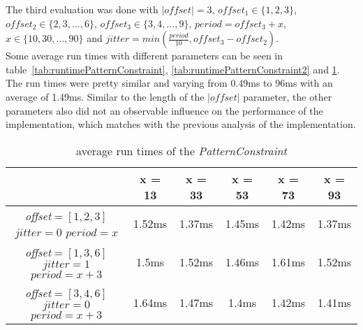 The third evaluation was done with $|offset| = 3$, $offset_1\in\{1, 2, 3\}$, $offset_2\in\{2, 3, ..., 6\}$, $offset_3\in\{3, 4, ..., 9\}$, $period=offset_3+x$, $x\in\{10, 30, ..., 90\}$ and $jitter = min(\frac{period}{10}, offset_3-offset_2)$.\\
Some average run times with different parameters can be seen in table~\ref{tab:runtimePatternConstraint}, \ref{tab:runtimePatternConstraint2} and \ref{tab:runtimePatternConstraint3}. The run times were pretty similar and varying from 0.49ms to 96ms with an average of 1.49ms. Similar to the length of the $|offset|$ parameter, the other parameters also did not an observable influence on the performance of the implementation, which matches with the previous analysis of the implementation.
\begin{table}
	\begin{tabular}{|c|c|c|c|c|c|}
		\hline
		& x = 13 & x = 33 & x = 53 & x = 73 & x = 93\\
		\hline
		\makecell{\textit{offset}$=[1,2,3]$\\$jitter=0$\\$period=x$}& 1.52ms & 1.37ms & 1.45ms & 1.42ms & 1.37ms\\
		\hline
		\makecell{\textit{offset}$=[1,3,6]$\\$jitter=1$\\$period=x+3$}& 1.5ms & 1.52ms & 1.46ms & 1.61ms & 1.52ms\\
		\hline
		\makecell{\textit{offset}$=[3,4,6]$\\$jitter=0$\\$period=x+3$}& 1.64ms & 1.47ms & 1.4ms & 1.42ms & 1.41ms\\
		\hline
	\end{tabular}
	\centering
	\caption{average run times of the \textit{PatternConstraint}}
	\label{tab:runtimePatternConstraint3}
\end{table}


